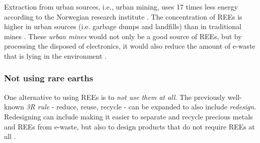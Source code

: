 Extraction from urban sources, i.e., urban mining, uses 17 times less energy according to the Norwegian research institute \cite{javed2024}. The concentration of REEs is higher in urban sources (i.e. garbage dumps and landfills) than in traditional mines \cite{javed2024}. These \textit{urban mines} would not only be a good source of REEs, but by processing the disposed of electronics, it would also reduce the amount of e-waste that is lying in the environment \cite{javed2024}.

\subsubsection{Not using rare earths}

One alternative to using REEs is to \textit{not use them at all}. The previously well-known \textit{3R rule} - reduce, reuse, recycle - can be expanded to also include \textit{redesign}. Redesigning can include making it easier to separate and recycle precious metals and REEs from e-waste, but also to design products that do not require REEs at all \cite{motorNoREE}.


